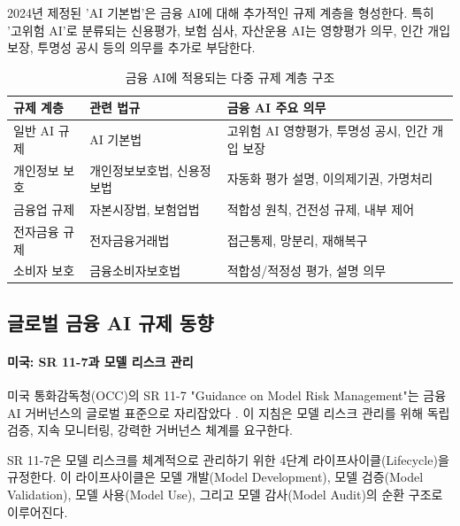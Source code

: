 2024년 제정된 'AI 기본법'은 금융 AI에 대해 추가적인 규제 계층을 형성한다. 특히 '고위험 AI'로 분류되는 신용평가, 보험 심사, 자산운용 AI는 영향평가 의무, 인간 개입 보장, 투명성 공시 등의 의무를 추가로 부담한다.

\begin{table}[htbp]
\centering
\caption{금융 AI에 적용되는 다중 규제 계층 구조}
\label{tab:17_multilayer}
\begin{tabularx}{\textwidth}{p{3cm}p{3.5cm}X}
\toprule
\textbf{규제 계층} & \textbf{관련 법규} & \textbf{금융 AI 주요 의무} \\
\midrule
일반 AI 규제 & AI 기본법 & 고위험 AI 영향평가, 투명성 공시, 인간 개입 보장 \\
개인정보 보호 & 개인정보보호법, 신용정보법 & 자동화 평가 설명, 이의제기권, 가명처리 \\
금융업 규제 & 자본시장법, 보험업법 & 적합성 원칙, 건전성 규제, 내부 제어 \\
전자금융 규제 & 전자금융거래법 & 접근통제, 망분리, 재해복구 \\
소비자 보호 & 금융소비자보호법 & 적합성/적정성 평가, 설명 의무 \\
\bottomrule
\end{tabularx}
\end{table}

\subsection{글로벌 금융 AI 규제 동향}
\label{sec:17.1.2}

\paragraph{미국: SR 11-7과 모델 리스크 관리}

미국 통화감독청(OCC)의 SR 11-7 "Guidance on Model Risk Management"는 금융 AI 거버넌스의 글로벌 표준으로 자리잡았다 \cite{occ2011sr117}. 이 지침은 모델 리스크 관리를 위해 독립 검증, 지속 모니터링, 강력한 거버넌스 체계를 요구한다.

SR 11-7은 모델 리스크를 체계적으로 관리하기 위한 4단계 라이프사이클(Lifecycle)을 규정한다. 이 라이프사이클은 모델 개발(Model Development), 모델 검증(Model Validation), 모델 사용(Model Use), 그리고 모델 감사(Model Audit)의 순환 구조로 이루어진다.

